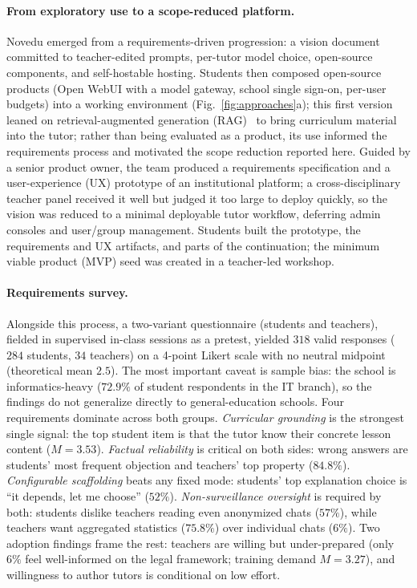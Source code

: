 \documentclass[runningheads]{llncs}
\begin{document}
\paragraph{From exploratory use to a scope-reduced platform.}
Novedu emerged from a requirements-driven progression: a vision document committed to teacher-edited prompts, per-tutor model choice, open-source components, and self-hostable hosting. Students then composed open-source products (Open WebUI with a model gateway, school single sign-on, per-user budgets) into a working environment (Fig.~\ref{fig:approaches}a); this first version leaned on retrieval-augmented generation (RAG)~\cite{lewis2020rag} to bring curriculum material into the tutor; rather than being evaluated as a product, its use informed the requirements process and motivated the scope reduction reported here. Guided by a senior product owner, the team produced a requirements specification and a user-experience (UX) prototype of an institutional platform; a cross-disciplinary teacher panel received it well but judged it too large to deploy quickly, so the vision was reduced to a minimal deployable tutor workflow, deferring admin consoles and user/group management. Students built the prototype, the requirements and UX artifacts, and parts of the continuation; the minimum viable product (MVP) seed was created in a teacher-led workshop.

\paragraph{Requirements survey.}
Alongside this process, a two-variant questionnaire (students and teachers), fielded in supervised in-class sessions as a pretest, yielded $318$ valid responses ($284$ students, $34$ teachers) on a 4-point Likert scale with no neutral midpoint (theoretical mean $2.5$). The most important caveat is sample bias: the school is informatics-heavy ($72.9\%$ of student respondents in the IT branch), so the findings do not generalize directly to general-education schools. Four requirements dominate across both groups. \emph{Curricular grounding} is the strongest single signal: the top student item is that the tutor know their concrete lesson content ($M=3.53$). \emph{Factual reliability} is critical on both sides: wrong answers are students' most frequent objection and teachers' top property ($84.8\%$). \emph{Configurable scaffolding} beats any fixed mode: students' top explanation choice is ``it depends, let me choose'' ($52\%$). \emph{Non-surveillance oversight} is required by both: students dislike teachers reading even anonymized chats ($57\%$), while teachers want aggregated statistics ($75.8\%$) over individual chats ($6\%$). Two adoption findings frame the rest: teachers are willing but under-prepared (only $6\%$ feel well-informed on the legal framework; training demand $M=3.27$), and willingness to author tutors is conditional on low effort.
\end{document}

